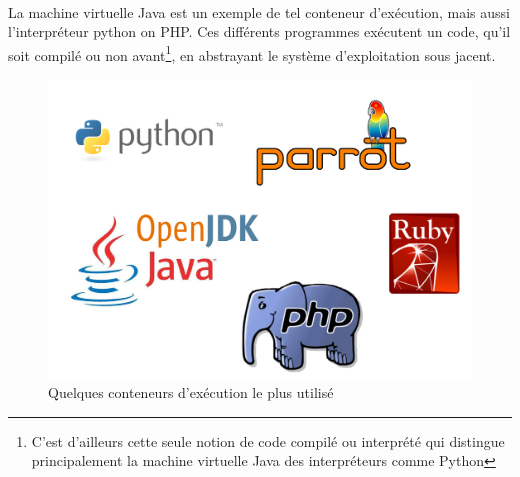 {  \paragraph{} La machine virtuelle Java est un exemple de tel conteneur d'exécution, mais aussi
  l'interpréteur python on PHP. Ces différents programmes exécutent un code, qu'il soit compilé ou non
  avant\footnote{C'est d'ailleurs cette seule notion de code compilé ou interprété qui distingue
  principalement la machine virtuelle Java des interpréteurs comme Python}, en abstrayant le système
  d'exploitation sous jacent.

  \begin{figure}[hb]
    \begin{center}
      \includegraphics[scale=0.3]{img/sample-containers.png}
      \caption{Quelques conteneurs d'exécution le plus utilisé}
      \label{interop}
    \end{center}
  \end{figure}
}


